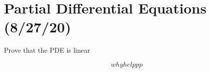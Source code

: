 \section{Partial Differential Equations (8/27/20)}
\begin{problem}
    Prove that the PDE is linear
\end{problem}
\begin{solution}
   \[
why helppp
   \]
\end{solution}

